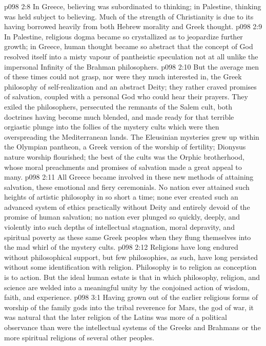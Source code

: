 \vs p098 2:8 In Greece, believing was subordinated to thinking; in Palestine, thinking was held subject to believing. Much of the strength of Christianity is due to its having borrowed heavily from both Hebrew morality and Greek thought.
\vs p098 2:9 In Palestine, religious dogma became so crystallized as to jeopardize further growth; in Greece, human thought became so abstract that the concept of God resolved itself into a misty vapour of pantheistic speculation not at all unlike the impersonal Infinity of the Brahman philosophers.
\vs p098 2:10 \pc But the average men of these times could not grasp, nor were they much interested in, the Greek philosophy of self\hyp{}realization and an abstract Deity; they rather craved promises of salvation, coupled with a personal God who could hear their prayers. They exiled the philosophers, persecuted the remnants of the Salem cult, both doctrines having become much blended, and made ready for that terrible orgiastic plunge into the follies of the mystery cults which were then overspreading the Mediterranean lands. The Eleusinian mysteries grew up within the Olympian pantheon, a Greek version of the worship of fertility; Dionysus nature worship flourished; the best of the cults was the Orphic brotherhood, whose moral preachments and promises of salvation made a great appeal to many.
\vs p098 2:11 All Greece became involved in these new methods of attaining salvation, these emotional and fiery ceremonials. No nation ever attained such heights of artistic philosophy in so short a time; none ever created such an advanced system of ethics practically without Deity and entirely devoid of the promise of human salvation; no nation ever plunged so quickly, deeply, and violently into such depths of intellectual stagnation, moral depravity, and spiritual poverty as these same Greek peoples when they flung themselves into the mad whirl of the mystery cults.
\vs p098 2:12 \pc Religions have long endured without philosophical support, but few philosophies, as such, have long persisted without some identification with religion. Philosophy is to religion as conception is to action. But the ideal human estate is that in which philosophy, religion, and science are welded into a meaningful unity by the conjoined action of wisdom, faith, and experience.
\vs p098 3:1 Having grown out of the earlier religious forms of worship of the family gods into the tribal reverence for Mars, the god of war, it was natural that the later religion of the Latins was more of a political observance than were the intellectual systems of the Greeks and Brahmans or the more spiritual religions of several other peoples.

